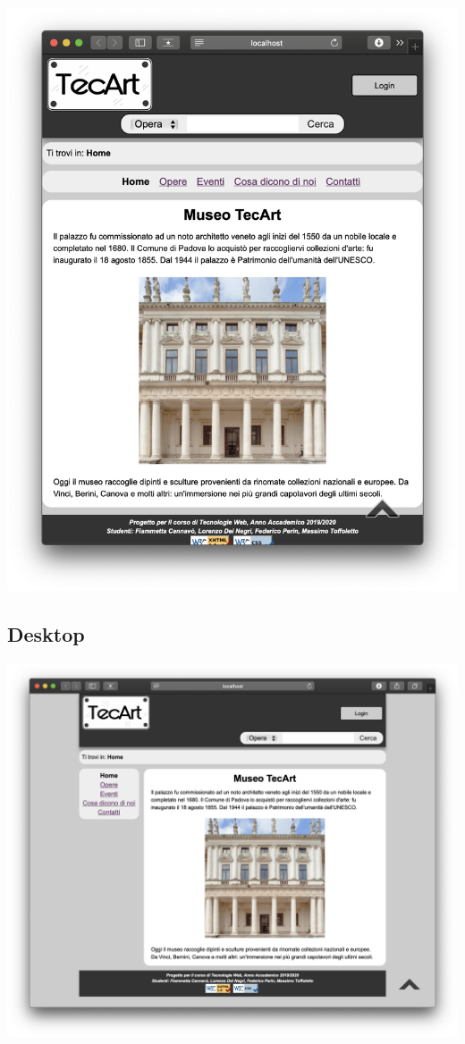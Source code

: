 \begin{center}
	\includegraphics[scale=0.4]{img/Tablet-pres}
\end{center}


\subsection{Desktop}
\label{presentazione-desktop}

\begin{center}
	\includegraphics[width=\textwidth]{img/Desktop-pres}
\end{center}


